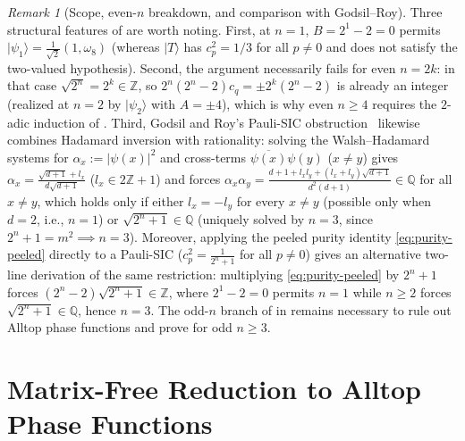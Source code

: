 \documentclass[11pt,a4paper]{article}
\theoremstyle{plain}
\theoremstyle{definition}
\theoremstyle{remark}
\newtheorem{remark}[lemma]{Remark}
\newcommand{\Q}{\mathbb{Q}}
\newcommand{\Z}{\mathbb{Z}}
\newcommand{\ket}[1]{|#1\rangle}
\newcommand{\abs}[1]{\lvert#1\rvert}
\numberwithin{equation}{section}
\begin{document}
\begin{remark}[Scope, even-$n$ breakdown, and comparison with Godsil--Roy]\label{rem:odd-shortcut}
Three structural features of  are worth noting. First, at $n = 1$, $B = 2^1 - 2 = 0$ permits $\ket{\psi_1} = \frac{1}{\sqrt{2}}(1, \omega_8)$ (whereas $\ket{T}$ has $c_p^2 = 1/3$ for all $p \neq 0$ and does not satisfy the two-valued hypothesis). Second, the argument necessarily fails for even $n = 2k$: in that case $\sqrt{2^n} = 2^k \in \Z$, so $2^n(2^n-2)c_q = \pm 2^k(2^n-2)$ is already an integer (realized at $n = 2$ by $\ket{\psi_2}$ with $A = \pm 4$), which is why even $n \ge 4$ requires the $2$-adic induction of . Third, Godsil and Roy's Pauli-SIC obstruction~\cite[Section~3, Lemma~3.1]{godsil2009equiangular} likewise combines Hadamard inversion with rationality: solving the Walsh--Hadamard systems for $\alpha_x := \abs{\psi(x)}^2$ and cross-terms $\overline{\psi(x)}\psi(y)$ ($x \neq y$) gives $\alpha_x = \frac{\sqrt{d+1} + l_x}{d\sqrt{d+1}}$ ($l_x \in 2\Z + 1$) and forces $\alpha_x \alpha_y = \frac{d + 1 + l_x l_y + (l_x + l_y)\sqrt{d+1}}{d^2(d+1)} \in \Q$ for all $x \neq y$, which holds only if either $l_x = -l_y$ for every $x \neq y$ (possible only when $d = 2$, i.e., $n = 1$) or $\sqrt{2^n + 1} \in \Q$ (uniquely solved by $n = 3$, since $2^n + 1 = m^2 \implies n = 3$). Moreover, applying the peeled purity identity \eqref{eq:purity-peeled} directly to a Pauli-SIC ($c_p^2 = \frac{1}{2^n+1}$ for all $p \neq 0$) gives an alternative two-line derivation of the same restriction: multiplying \eqref{eq:purity-peeled} by $2^n + 1$ forces $(2^n - 2)\sqrt{2^n + 1} \in \Z$, where $2^1 - 2 = 0$ permits $n = 1$ while $n \ge 2$ forces $\sqrt{2^n + 1} \in \Q$, hence $n = 3$. The odd-$n$ branch of  in  remains necessary to rule out Alltop phase functions and prove  for odd $n \ge 3$.
\end{remark}

\section{Matrix-Free Reduction to Alltop Phase Functions}\label{sec:reduction}
\end{document}
